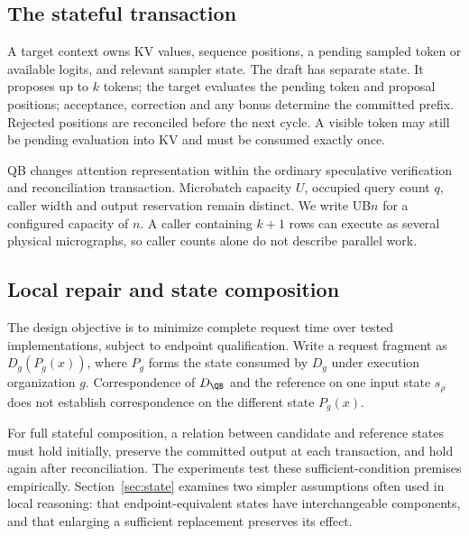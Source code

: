 \subsection{The stateful transaction}
A target context owns KV values, sequence positions, a pending sampled token or available logits, and relevant sampler state. The draft has separate state. It proposes up to $k$ tokens; the target evaluates the pending token and proposal positions; acceptance, correction and any bonus determine the committed prefix. Rejected positions are reconciled before the next cycle. A visible token may still be pending evaluation into KV and must be consumed exactly once.

QB changes attention representation within the ordinary speculative verification and reconciliation transaction. Microbatch capacity $U$, occupied query count $q$, caller width and output reservation remain distinct. We write UB$n$ for a configured capacity of $n$. A caller containing $k+1$ rows can execute as several physical micrographs, so caller counts alone do not describe parallel work.

\subsection{Local repair and state composition}
The design objective is to minimize complete request time over tested implementations, subject to endpoint qualification. Write a request fragment as $D_g(P_g(x))$, where $P_g$ forms the state consumed by $D_g$ under execution organization $g$. Correspondence of $D_{\QB}$ and the reference on one input state $s_\rho$ does not establish correspondence on the different state $P_g(x)$.

For full stateful composition, a relation between candidate and reference states must hold initially, preserve the committed output at each transaction, and hold again after reconciliation. The experiments test these sufficient-condition premises empirically. Section~\ref{sec:state} examines two simpler assumptions often used in local reasoning: that endpoint-equivalent states have interchangeable components, and that enlarging a sufficient replacement preserves its effect.
